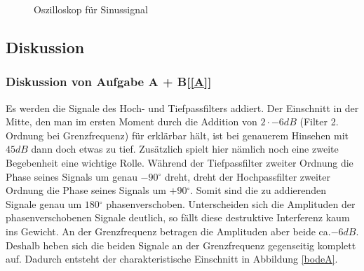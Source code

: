 \begin{figure}[h]
\centering
{}
\caption{Oszilloskop für Sinussignal}
\end{figure}


\newpage
\subsection{Diskussion}
\subsubsection{Diskussion von Aufgabe A + B[\ref{A}]}
Es werden die Signale des Hoch- und Tiefpassfilters addiert. Der Einschnitt in der Mitte, den man im ersten Moment durch die Addition von $2\cdot \si{-6}{dB}$ (Filter 2. Ordnung bei Grenzfrequenz) für erklärbar hält, ist bei genauerem Hinsehen mit $\si{45}{dB}$ dann doch etwas zu tief. Zusätzlich spielt hier nämlich noch eine zweite Begebenheit eine wichtige Rolle. Während der Tiefpassfilter zweiter Ordnung die Phase seines Signals um genau $\si{-90}{^{\circ}}$ dreht, dreht der Hochpassfilter zweiter Ordnung die Phase seines Signals um $\si{+90}{^{\circ}}$. Somit sind die zu addierenden Signale genau um $\si{180}{^{\circ}}$ phasenverschoben. Unterscheiden sich die Amplituden der phasenverschobenen Signale deutlich, so fällt diese destruktive Interferenz kaum ins Gewicht. An der Grenzfrequenz betragen die Amplituden aber beide ca.$\si{-6}{dB}$. Deshalb heben sich die beiden Signale an der Grenzfrequenz gegenseitig komplett auf. Dadurch entsteht der charakteristische Einschnitt in Abbildung \ref{bodeA}.


